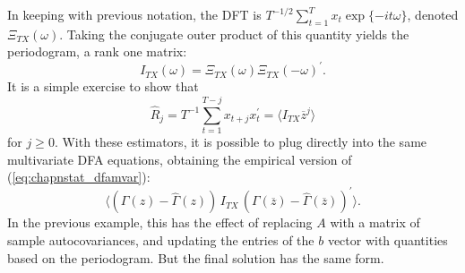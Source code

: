 \documentclass[a4paper]{book}
\begin{document}
In keeping with previous notation, the DFT is $T^{-1/2} \sum_{t=1}^T x_t \exp \{ - i t \omega \}$, denoted $\Xi_{T X} (\omega)$.  Taking the conjugate outer product of this quantity yields the periodogram, a rank one matrix:
\[
  I_{TX} (\omega) = \Xi_{TX} (\omega) {\Xi_{TX} (-\omega)}^{\prime}.
\]
  It is a simple exercise to show that
\[
  \widehat{R}_j = T^{-1} \sum_{t=1}^{T-j} x_{t+j} x_t^{\prime} = \langle I_{TX} \overline{z}^j \rangle
\]
 for $j \geq 0$.  With these estimators, it is possible to plug directly into the same multivariate DFA equations, obtaining the empirical version of (\ref{eq:chapnstat_dfamvar}):
\[
   \langle  \left( \Gamma (z) -  \widehat{\Gamma} (z) \right) \, I_{TX} \,
  {  \left( \Gamma (\overline{z}) -  \widehat{\Gamma} (\overline{z}) \right) }^{\prime} \rangle.
 \]
 In the previous example, this has the effect of replacing $A$ with a matrix of sample autocovariances, and updating the entries of the $b$ vector with quantities based on the 
periodogram.  But the final solution has the same form.
\end{document}
